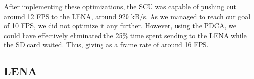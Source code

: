 After implementing these optimizations, the \ac{SCU} was capable of pushing out around
12 FPS to the \ac{LENA}, around 920 kB/s. As we managed to reach our goal of 10
FPS, we did not optimize it any further. However, using the \ac{PDCA}, we could
have effectively eliminated the 25\% time spent sending to the \ac{LENA} while
the \ac{SD} card waited. Thus, giving as a frame rate of around 16
FPS. 



\subsection{LENA}



